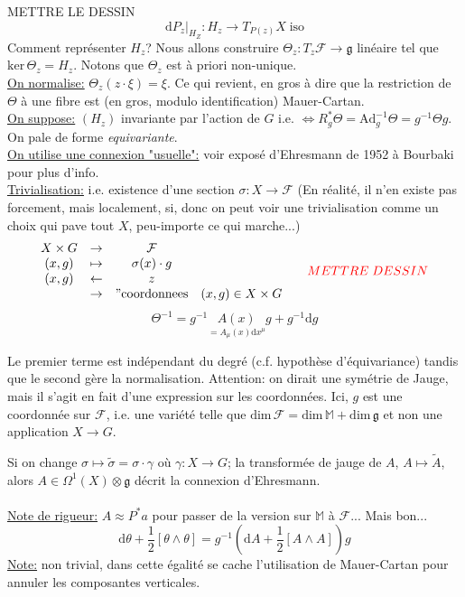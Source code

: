\documentclass[a4paper,11pt]{article}
\renewcommand{\d}{{\mathrm{d}}}
\begin{document}
\color{red}METTRE LE DESSIN\color{black}
$$\d P_z |_{H_Z} : H_z \to T_{P(z)}X \; \mathrm{iso}$$
Comment représenter $H_z$? Nous allons construire $\Theta_z: T_z \mathcal{F} \to \mathfrak{g}$ linéaire tel que $\mathrm{ker}\, \Theta_z = H_z$. Notons que $\Theta_z$ est à priori non-unique.\\
\underline{On normalise:} $\Theta_z (z\cdot \xi) = \xi$. Ce qui revient, en gros à dire que la restriction de $\Theta$ à une fibre est (en gros, modulo identification) Mauer-Cartan.\\
\underline{On suppose:} $(H_z)$ invariante par l'action de $G$ i.e. $\iff R_g^* \Theta = \mathrm{Ad}_g^{-1} \Theta = g^{-1} \Theta g$. On pale de forme \emph{equivariante}.\\
\underline{On utilise une connexion "usuelle":} voir exposé d'Ehresmann de 1952 à Bourbaki pour plus d'info.\\
\underline{Trivialisation:} i.e. existence d'une section $\sigma: X \to \mathcal{F}$ (En réalité, il n'en existe pas forcement, mais localement, si, donc on peut voir une trivialisation comme un choix qui pave tout $X$, peu-importe ce qui marche...)
$$\begin{matrix}
X\times G & \to & \mathcal{F}&\\
(x,g) & \mapsto & \sigma(x)\cdot g&\\
(x,g) & \leftarrow & z&\\
&\to & "\mathrm{coordonnees}& (x,g)\in X\times G
\end{matrix}
\quad \quad \color{red}METTRE\;DESSIN
$$
$$\Theta^{-1} = g^{-1} \underset{=A_\mu(x)\d x^\mu}{A(x)} g + g^{-1} \d g$$

Le premier terme est indépendant du degré (c.f. hypothèse d'équivariance) tandis que le second gère la normalisation. Attention: on dirait une symétrie de Jauge, mais il s'agit en fait d'une expression sur les coordonnées. Ici, $g$ est une coordonnée sur $\mathcal{F}$, i.e. une variété telle que $\mathrm{dim}\,\mathcal{F} =\mathrm{dim}\,\mathbb{M}+\mathrm{dim}\,\mathfrak{g}$ et non une application $X \to G$.

Si on change $\sigma \mapsto \tilde \sigma = \sigma \cdot \gamma$ où $\gamma: X \to G$; la transformée de jauge de $A$, $A \mapsto \tilde A$, alors $A\in \Omega^1(X)\otimes \mathfrak{g}$ décrit la connexion d'Ehresmann.\\ \\
\underline{Note de rigueur:} $A\approx P^* a$ pour passer de la version sur $\mathbb{M}$ à $\mathcal{F}$... Mais bon...
$$\d \theta + \frac{1}{2}[\theta\wedge\theta] = g^{-1} \left(\d A +\frac{1}{2}[A\wedge A]\right)g$$
\underline{Note:} non trivial, dans cette égalité se cache l'utilisation de Mauer-Cartan pour annuler les composantes verticales.
\end{document}

